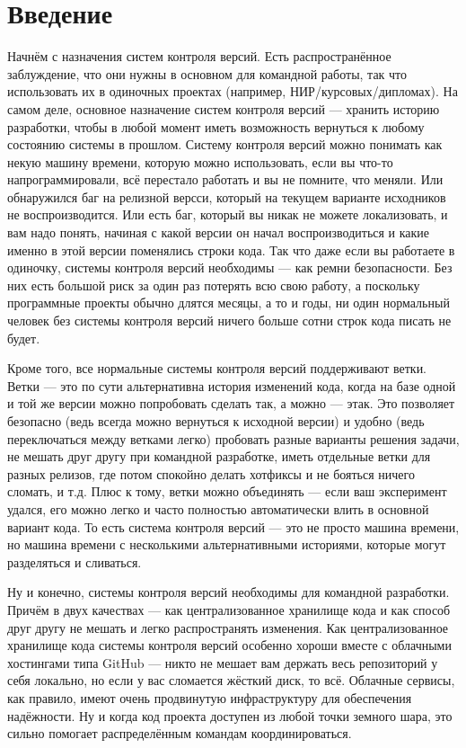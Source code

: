 \documentclass{../text-style}
\begin{document}
\maketitle
\thispagestyle{empty}

\section{Введение}

Начнём с назначения систем контроля версий. Есть распространённое заблуждение, что они нужны в основном для командной работы, так что использовать их в одиночных проектах (например, НИР/курсовых/дипломах). На самом деле, основное назначение систем контроля версий --- хранить историю разработки, чтобы в любой момент иметь возможность вернуться к любому состоянию системы в прошлом. Систему контроля версий можно понимать как некую машину времени, которую можно использовать, если вы что-то напрограммировали, всё перестало работать и вы не помните, что меняли. Или обнаружился баг на релизной версси, который на текущем варианте исходников не воспроизводится. Или есть баг, который вы никак не можете локализовать, и вам надо понять, начиная с какой версии он начал воспроизводиться и какие именно в этой версии поменялись строки кода. Так что даже если вы работаете в одиночку, системы контроля версий необходимы --- как ремни безопасности. Без них есть большой риск за один раз потерять всю свою работу, а поскольку программные проекты обычно длятся месяцы, а то и годы, ни один нормальный человек без системы контроля версий ничего больше сотни строк кода писать не будет.

Кроме того, все нормальные системы контроля версий поддерживают ветки. Ветки --- это по сути альтернативна история изменений кода, когда на базе одной и той же версии можно попробовать сделать так, а можно --- этак. Это позволяет безопасно (ведь всегда можно вернуться к исходной версии) и удобно (ведь переключаться между ветками легко) пробовать разные варианты решения задачи, не мешать друг другу при командной разработке, иметь отдельные ветки для разных релизов, где потом спокойно делать хотфиксы и не бояться ничего сломать, и т.д. Плюс к тому, ветки можно объединять --- если ваш эксперимент удался, его можно легко и часто полностью автоматически влить в основной вариант кода. То есть система контроля версий --- это не просто машина времени, но машина времени с несколькими альтернативными историями, которые могут разделяться и сливаться.

Ну и конечно, системы контроля версий необходимы для командной разработки. Причём в двух качествах --- как централизованное хранилище кода и как способ друг другу не мешать и легко распространять изменения. Как централизованное хранилище кода системы контроля версий особенно хороши вместе с облачными хостингами типа GitHub --- никто не мешает вам держать весь репозиторий у себя локально, но если у вас сломается жёсткий диск, то всё. Облачные сервисы, как правило, имеют очень продвинутую инфраструктуру для обеспечения надёжности. Ну и когда код проекта доступен из любой точки земного шара, это сильно помогает распределённым командам координироваться.
\end{document}
